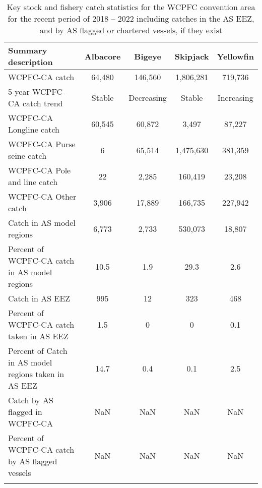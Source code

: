 \begin{longtable}{lcccc}
\caption{Key stock and fishery catch statistics for the WCPFC convention area for the recent period of 2018 -- 2022 including catches in the AS EEZ, and by AS flagged or chartered vessels, if they exist} \\ 
  \hline
Summary description & Albacore & Bigeye & Skipjack & Yellowfin \\ 
  \hline
WCPFC-CA catch & 64,480 & 146,560 & 1,806,281 & 719,736 \\ 
  5-year WCPFC-CA catch trend & Stable & Decreasing & Stable & Increasing \\ 
  WCPFC-CA Longline catch & 60,545 & 60,872 & 3,497 & 87,227 \\ 
  WCPFC-CA Purse seine catch & 6 & 65,514 & 1,475,630 & 381,359 \\ 
  WCPFC-CA Pole and line catch & 22 & 2,285 & 160,419 & 23,208 \\ 
  WCPFC-CA Other catch & 3,906 & 17,889 & 166,735 & 227,942 \\ 
  Catch in AS model regions & 6,773 & 2,733 & 530,073 & 18,807 \\ 
  Percent of WCPFC-CA catch in AS model regions & 10.5 & 1.9 & 29.3 & 2.6 \\ 
   \hline
Catch in AS EEZ & 995 & 12 & 323 & 468 \\ 
  Percent of WCPFC-CA catch taken in AS EEZ & 1.5 & 0 & 0 & 0.1 \\ 
  Percent of Catch in AS model regions taken in AS EEZ & 14.7 & 0.4 & 0.1 & 2.5 \\ 
  Catch by AS flagged in WCPFC-CA & NaN & NaN & NaN & NaN \\ 
  Percent of WCPFC-CA catch by AS flagged vessels & NaN & NaN & NaN & NaN \\ 
  \hline
\label{cat_sum_tab}
\end{longtable}
